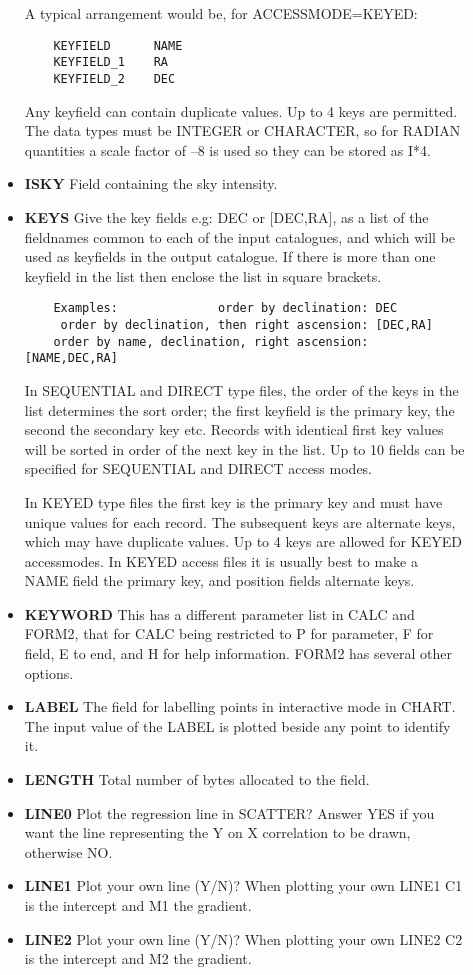 \begin{description}
\begin{itemize}
A typical arrangement would be, for ACCESSMODE=KEYED:
\begin{verbatim}
    KEYFIELD      NAME
    KEYFIELD_1    RA
    KEYFIELD_2    DEC
\end{verbatim}
Any keyfield can contain duplicate values.
Up to 4 keys are permitted.
The data types must be INTEGER or CHARACTER, so for RADIAN quantities a scale
factor of --8 is used so they can be stored as I*4.
\item{\bf ISKY} Field containing the sky intensity.
\item{\bf KEYS} Give the key fields e.g: DEC or [DEC,RA], as a list of the
fieldnames common to each of the input catalogues, and which will be used
as keyfields in the output catalogue.
If there is more than one keyfield in the list then enclose the list in
square brackets.
\begin{verbatim}
    Examples:              order by declination: DEC
     order by declination, then right ascension: [DEC,RA]
    order by name, declination, right ascension: [NAME,DEC,RA]
\end{verbatim}
In SEQUENTIAL and DIRECT type files, the order of the keys in the list
determines the sort order; the first keyfield is the primary key, the
second the secondary key etc.
Records with identical first key values will be sorted in order of the next
key in the list.
Up to 10 fields can be specified for SEQUENTIAL and DIRECT access modes.

In KEYED type files the first key is the primary key and must have unique
values for each record.
The subsequent keys are alternate keys, which may have duplicate values.
Up to 4 keys are allowed for KEYED accessmodes.
In KEYED access files it is usually best to make a NAME field the primary
key, and position fields alternate keys.
\item{\bf KEYWORD} This has a different parameter list in CALC and FORM2,
that for CALC being restricted to P for parameter, F for field, E to end,
and H for help information.
FORM2 has several other options.
\item{\bf LABEL} The field for labelling points in interactive mode in CHART.
The input value of the LABEL is plotted beside any point to identify it.
\item{\bf LENGTH} Total number of bytes allocated to the field.
\item{\bf LINE0} Plot the regression line in SCATTER?
Answer YES if you want the line representing the Y on X correlation to be
drawn, otherwise NO.
\item{\bf LINE1} Plot your own line (Y/N)? When plotting your own LINE1 C1
is the intercept and M1 the gradient.
\item{\bf LINE2} Plot your own line (Y/N)? When plotting your own LINE2 C2
is the intercept and M2 the gradient.


\end{itemize}
\end{description}

